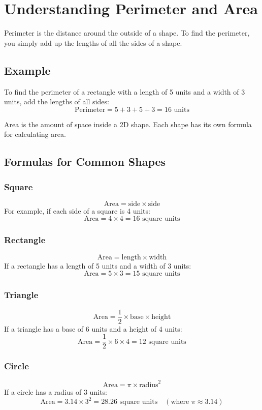\section{Understanding Perimeter and Area}
Perimeter is the distance around the outside of a shape. To find the perimeter, you simply add up the lengths of all the sides of a shape.

\subsection{Example}
To find the perimeter of a rectangle with a length of 5 units and a width of 3 units, add the lengths of all sides:
\[
\text{Perimeter} = 5 + 3 + 5 + 3 = 16 \text{ units}
\]

Area is the amount of space inside a 2D shape. Each shape has its own formula for calculating area.

\subsection{Formulas for Common Shapes}
\subsubsection{Square}
\[
\text{Area} = \text{side} \times \text{side}
\]
For example, if each side of a square is 4 units:
\[
\text{Area} = 4 \times 4 = 16 \text{ square units}
\]

\subsubsection{Rectangle}
\[
\text{Area} = \text{length} \times \text{width}
\]
If a rectangle has a length of 5 units and a width of 3 units:
\[
\text{Area} = 5 \times 3 = 15 \text{ square units}
\]

\subsubsection{Triangle}
\[
\text{Area} = \frac{1}{2} \times \text{base} \times \text{height}
\]
If a triangle has a base of 6 units and a height of 4 units:
\[
\text{Area} = \frac{1}{2} \times 6 \times 4 = 12 \text{ square units}
\]

\subsubsection{Circle}
\[
\text{Area} = \pi \times \text{radius}^2
\]
If a circle has a radius of 3 units:
\[
\text{Area} = 3.14 \times 3^2 = 28.26 \text{ square units} \quad (\text{where } \pi \approx 3.14)
\]


